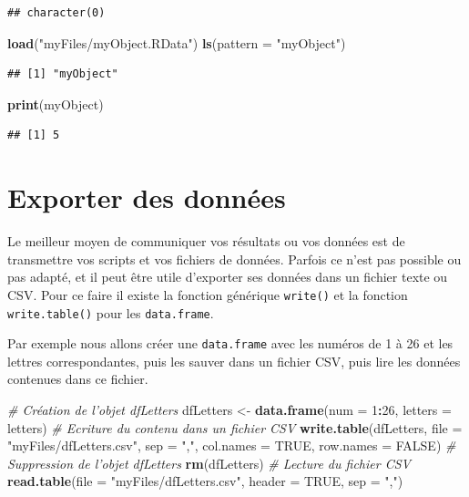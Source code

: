 \documentclass[
]{book}
\newenvironment{Shaded}{\begin{snugshade}}{\end{snugshade}}
\newcommand{\CommentTok}[1]{\textcolor[rgb]{0.56,0.35,0.01}{\textit{#1}}}
\newcommand{\DataTypeTok}[1]{\textcolor[rgb]{0.13,0.29,0.53}{#1}}
\newcommand{\DecValTok}[1]{\textcolor[rgb]{0.00,0.00,0.81}{#1}}
\newcommand{\KeywordTok}[1]{\textcolor[rgb]{0.13,0.29,0.53}{\textbf{#1}}}
\newcommand{\NormalTok}[1]{#1}
\newcommand{\OperatorTok}[1]{\textcolor[rgb]{0.81,0.36,0.00}{\textbf{#1}}}
\newcommand{\OtherTok}[1]{\textcolor[rgb]{0.56,0.35,0.01}{#1}}
\newcommand{\StringTok}[1]{\textcolor[rgb]{0.31,0.60,0.02}{#1}}
\begin{document}
\begin{verbatim}
## character(0)
\end{verbatim}

\begin{Shaded}
\begin{Highlighting}[]
\KeywordTok{load}\NormalTok{(}\StringTok{"myFiles/myObject.RData"}\NormalTok{)}
\KeywordTok{ls}\NormalTok{(}\DataTypeTok{pattern =} \StringTok{"myObject"}\NormalTok{)}
\end{Highlighting}
\end{Shaded}

\begin{verbatim}
## [1] "myObject"
\end{verbatim}

\begin{Shaded}
\begin{Highlighting}[]
\KeywordTok{print}\NormalTok{(myObject)}
\end{Highlighting}
\end{Shaded}

\begin{verbatim}
## [1] 5
\end{verbatim}

\hypertarget{l016write}{%
\section{Exporter des données}\label{l016write}}

Le meilleur moyen de communiquer vos résultats ou vos données est de transmettre vos scripts et vos fichiers de données. Parfois ce n'est pas possible ou pas adapté, et il peut être utile d'exporter ses données dans un fichier texte ou CSV. Pour ce faire il existe la fonction générique \texttt{write()} et la fonction \texttt{write.table()} pour les \texttt{data.frame}.

Par exemple nous allons créer une \texttt{data.frame} avec les numéros de 1 à 26 et les lettres correspondantes, puis les sauver dans un fichier CSV, puis lire les données contenues dans ce fichier.

\begin{Shaded}
\begin{Highlighting}[]
\CommentTok{# Création de l'objet dfLetters}
\NormalTok{dfLetters <-}\StringTok{ }\KeywordTok{data.frame}\NormalTok{(}\DataTypeTok{num =} \DecValTok{1}\OperatorTok{:}\DecValTok{26}\NormalTok{, }\DataTypeTok{letters =}\NormalTok{ letters)}
\CommentTok{# Ecriture du contenu dans un fichier CSV}
\KeywordTok{write.table}\NormalTok{(dfLetters, }\DataTypeTok{file =} \StringTok{"myFiles/dfLetters.csv"}\NormalTok{, }
  \DataTypeTok{sep =} \StringTok{","}\NormalTok{, }\DataTypeTok{col.names =} \OtherTok{TRUE}\NormalTok{, }\DataTypeTok{row.names =} \OtherTok{FALSE}\NormalTok{)}
\CommentTok{# Suppression de l'objet dfLetters}
\KeywordTok{rm}\NormalTok{(dfLetters)}
\CommentTok{# Lecture du fichier CSV}
\KeywordTok{read.table}\NormalTok{(}\DataTypeTok{file =} \StringTok{"myFiles/dfLetters.csv"}\NormalTok{, }\DataTypeTok{header =} \OtherTok{TRUE}\NormalTok{, }\DataTypeTok{sep =} \StringTok{","}\NormalTok{)}
\end{Highlighting}
\end{Shaded}
\end{document}
